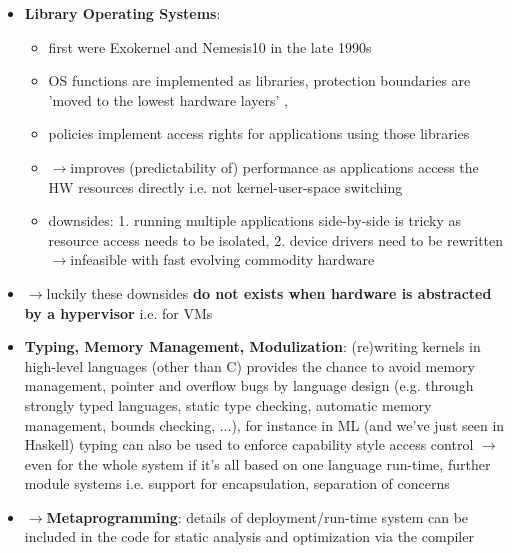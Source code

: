 \documentclass{scrartcl}
\newcommand{\means}{$\rightarrow{}$}
\begin{document}
\begin{itemize}
    \item \textbf{Library Operating Systems}:
    \begin{itemize}
        \item first were Exokernel and Nemesis10 in the late 1990s
        \item OS functions are implemented as libraries, protection boundaries are 'moved to the lowest hardware layers' ,
        \item policies implement access rights for applications using those libraries
        \item[]\means improves (predictability of) performance as applications access the HW resources directly i.e. not kernel-user-space switching 
        \item downsides: 1. running multiple applications side-by-side is tricky as resource access needs to be isolated, 2. device drivers need to be rewritten \means infeasible with fast evolving commodity hardware    
    \end{itemize}
    \item[] \means luckily these downsides \textbf{do not exists when hardware is abstracted by a hypervisor} i.e. for VMs
    \item \textbf{Typing, Memory Management, Modulization}: (re)writing kernels in high-level languages (other than C) provides the chance to avoid memory management, pointer and overflow bugs by language design (e.g. through strongly typed languages, static type checking, automatic memory management,  bounds checking, ...), for instance in ML (and we've just seen in Haskell) typing can also be used to enforce capability style access control \means even for the whole system if it's all based on one language run-time, further module systems i.e. support for encapsulation, separation of concerns 
    \item[]\means\textbf{Metaprogramming}: details of deployment/run-time system can be included in the code for static analysis and optimization via the compiler
    

\end{itemize}
\end{document}
